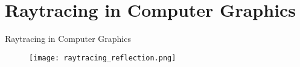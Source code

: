 \section{Raytracing in Computer Graphics}

\begin{frame}{Raytracing in Computer Graphics}

    \begin{figure}
        \centering
        \texttt{[image: raytracing\_reflection.png]}
    \end{figure}
    
\end{frame}